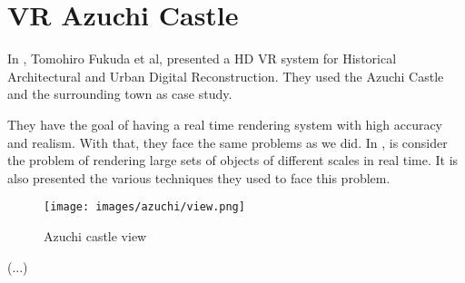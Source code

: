 

\section{VR Azuchi Castle} %
\label{sec:vr_azuchi_castle}


In \cite{fukuda2015}, Tomohiro Fukuda et al, presented a \gls{HD} \gls{VR} system for Historical Architectural and Urban Digital Reconstruction. They used the Azuchi Castle and the surrounding town as case study. 

They have the goal of having a real time rendering system with high accuracy and realism. With that, they face the same problems as we did. In \cite{fukuda2015}, is consider the problem of rendering large sets of objects of different scales in real time. It is also presented the various techniques they used to face this problem.

\begin{figure}[htbp]
	\centering
	\texttt{[image: images/azuchi/view.png]}
	\caption{Azuchi castle view}
	\label{fig:azichiview}
\end{figure}

(...)

		